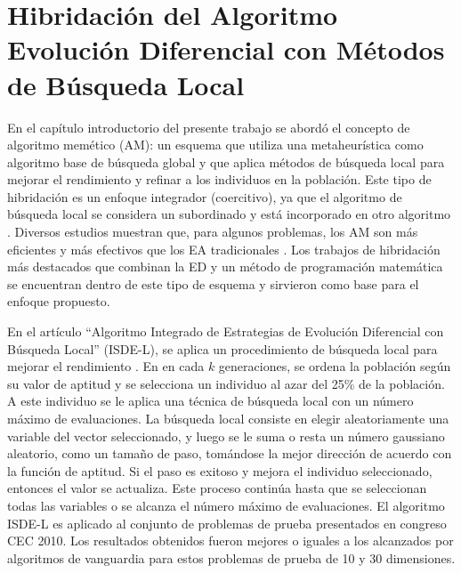 \section{Hibridación del Algoritmo Evolución Diferencial con Métodos de Búsqueda Local}

En el capítulo introductorio del presente trabajo se abordó el concepto de algoritmo memético (AM): un esquema que utiliza una metaheurística como algoritmo base de búsqueda global y que aplica métodos de búsqueda local para mejorar el rendimiento y refinar a los individuos en la población. Este tipo de hibridación es un enfoque integrador (coercitivo), ya que el algoritmo de búsqueda local se considera un subordinado y está incorporado en otro algoritmo \cite{raidl2006unified}. Diversos estudios muestran que, para algunos problemas, los AM son más eficientes y más efectivos que los EA tradicionales \cite{krasnogor2005tutorial}. Los trabajos de hibridación más destacados que combinan la ED y un método de programación matemática se encuentran dentro de este tipo de esquema y sirvieron como base para el enfoque propuesto.

En el artículo ``Algoritmo Integrado de Estrategias de Evolución Diferencial con Búsqueda Local'' (ISDE-L), se aplica un procedimiento de búsqueda local para mejorar el rendimiento \cite{elsayed2011integrated}. En en cada $k$ generaciones, se ordena la población según su valor de aptitud y se selecciona un individuo al azar del 25\% de la población. A este individuo se le aplica una técnica de búsqueda local con un número máximo de evaluaciones. La búsqueda local consiste en elegir aleatoriamente una variable del vector seleccionado, y luego se le suma o resta un número gaussiano aleatorio, como un tamaño de paso, tomándose la mejor dirección de acuerdo con la función de aptitud. Si el paso es exitoso y  mejora el individuo seleccionado, entonces el valor se actualiza. Este proceso continúa hasta que se seleccionan todas las variables o se alcanza el número máximo de evaluaciones. El algoritmo ISDE-L es aplicado al conjunto de problemas de prueba presentados en congreso CEC 2010. Los resultados obtenidos fueron mejores o iguales a los alcanzados por algoritmos de vanguardia para estos problemas de prueba de 10 y 30 dimensiones.


